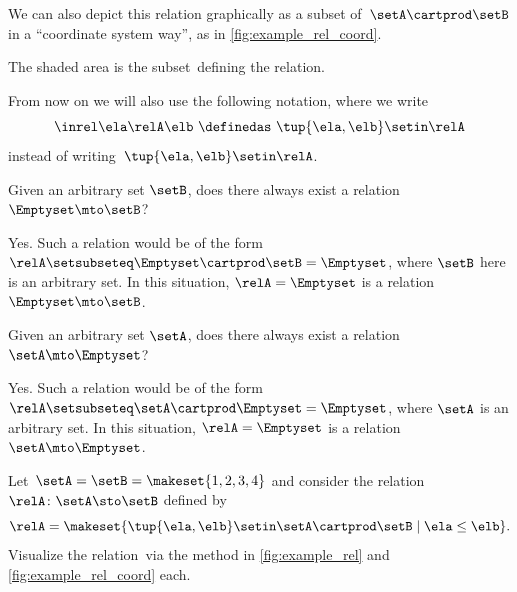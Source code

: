 \begin{marginfigure}
    \centering
    \caption{Relations visualized in ``coordinate systems''.}
    \label{fig:example_rel_coord}
\end{marginfigure}

We can also depict this relation graphically as a subset of~$\setA \cartprod \setB$ in a ``coordinate system way'', as in \cref{fig:example_rel_coord}.

The shaded area is the subset~\relA defining the relation.

\begin{remark}
    From now on we will also use the following notation, where we write
    \begin{equation}
        \inrel \ela \relA \elb \ \definedas\  \tup{\ela,\elb}\setin \relA
    \end{equation}
    instead of writing~$\tup{\ela,\elb}\setin \relA$.
\end{remark}

\begin{exercise}
    Given an arbitrary set $\setB$, does there always exist a relation $\Emptyset \mto \setB$?
\end{exercise}

\begin{solution}
    Yes.
    Such a relation would be of the form~$\relA \setsubseteq \Emptyset \cartprod \setB = \Emptyset$, where $\setB$ here is an arbitrary set.
    In this situation, $\relA=\Emptyset$ is a relation $\Emptyset \mto \setB$.
\end{solution}

\begin{exercise}
    Given an arbitrary set $\setA$, does there always exist a relation $\setA \mto \Emptyset$?
\end{exercise}

\begin{solution}
    Yes.
    Such a relation would be of the form~$\relA \setsubseteq \setA \cartprod \Emptyset = \Emptyset$, where $\setA$ is an arbitrary set.
    In this situation, $\relA=\Emptyset$ is a relation $\setA \mto \Emptyset$.
\end{solution}

\vfill
\begin{gradedexercise}
    \label{ex:visualize-leq-relation}
    Let~$\setA = \setB = \makeset{1, 2, 3, 4 }$ and consider the relation~$\relA \colon \setA \sto \setB$ defined by
    \begin{equation}
        \relA = \makeset{ \tup{\ela,\elb} \setin \setA \cartprod \setB \mid \ela \leq \elb }.
    \end{equation}
    Visualize the relation~\relA via the method in \cref{fig:example_rel} and \cref{fig:example_rel_coord} each.
\end{gradedexercise}


